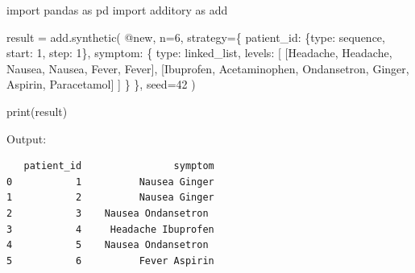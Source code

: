 \documentclass[
  letterpaper,
]{scrbook}
\newenvironment{Shaded}{\begin{snugshade}}{\end{snugshade}}
\newcommand{\BuiltInTok}[1]{\textcolor[rgb]{0.00,0.23,0.31}{#1}}
\newcommand{\DecValTok}[1]{\textcolor[rgb]{0.68,0.00,0.00}{#1}}
\newcommand{\ImportTok}[1]{\textcolor[rgb]{0.00,0.46,0.62}{#1}}
\newcommand{\NormalTok}[1]{\textcolor[rgb]{0.00,0.23,0.31}{#1}}
\newcommand{\OperatorTok}[1]{\textcolor[rgb]{0.37,0.37,0.37}{#1}}
\newcommand{\StringTok}[1]{\textcolor[rgb]{0.13,0.47,0.30}{#1}}
\begin{document}
\begin{Shaded}
\begin{Highlighting}[]
\ImportTok{import}\NormalTok{ pandas }\ImportTok{as}\NormalTok{ pd}
\ImportTok{import}\NormalTok{ additory }\ImportTok{as}\NormalTok{ add}

\NormalTok{result }\OperatorTok{=}\NormalTok{ add.synthetic(}
    \StringTok{\textquotesingle{}@new\textquotesingle{}}\NormalTok{,}
\NormalTok{    n}\OperatorTok{=}\DecValTok{6}\NormalTok{,}
\NormalTok{    strategy}\OperatorTok{=}\NormalTok{\{}
        \StringTok{\textquotesingle{}patient\_id\textquotesingle{}}\NormalTok{: \{}\StringTok{\textquotesingle{}type\textquotesingle{}}\NormalTok{: }\StringTok{\textquotesingle{}sequence\textquotesingle{}}\NormalTok{, }\StringTok{\textquotesingle{}start\textquotesingle{}}\NormalTok{: }\DecValTok{1}\NormalTok{, }\StringTok{\textquotesingle{}step\textquotesingle{}}\NormalTok{: }\DecValTok{1}\NormalTok{\},}
        \StringTok{\textquotesingle{}symptom\textquotesingle{}}\NormalTok{: \{}
            \StringTok{\textquotesingle{}type\textquotesingle{}}\NormalTok{: }\StringTok{\textquotesingle{}linked\_list\textquotesingle{}}\NormalTok{,}
            \StringTok{\textquotesingle{}levels\textquotesingle{}}\NormalTok{: [}
\NormalTok{                [}\StringTok{\textquotesingle{}Headache\textquotesingle{}}\NormalTok{, }\StringTok{\textquotesingle{}Headache\textquotesingle{}}\NormalTok{, }\StringTok{\textquotesingle{}Nausea\textquotesingle{}}\NormalTok{, }\StringTok{\textquotesingle{}Nausea\textquotesingle{}}\NormalTok{, }\StringTok{\textquotesingle{}Fever\textquotesingle{}}\NormalTok{, }\StringTok{\textquotesingle{}Fever\textquotesingle{}}\NormalTok{],}
\NormalTok{                [}\StringTok{\textquotesingle{}Ibuprofen\textquotesingle{}}\NormalTok{, }\StringTok{\textquotesingle{}Acetaminophen\textquotesingle{}}\NormalTok{, }\StringTok{\textquotesingle{}Ondansetron\textquotesingle{}}\NormalTok{, }\StringTok{\textquotesingle{}Ginger\textquotesingle{}}\NormalTok{, }\StringTok{\textquotesingle{}Aspirin\textquotesingle{}}\NormalTok{, }\StringTok{\textquotesingle{}Paracetamol\textquotesingle{}}\NormalTok{]}
\NormalTok{            ]}
\NormalTok{        \}}
\NormalTok{    \},}
\NormalTok{    seed}\OperatorTok{=}\DecValTok{42}
\NormalTok{)}

\BuiltInTok{print}\NormalTok{(result)}
\end{Highlighting}
\end{Shaded}

Output:

\begin{verbatim}
   patient_id                symptom
0           1          Nausea Ginger
1           2          Nausea Ginger
2           3    Nausea Ondansetron
3           4     Headache Ibuprofen
4           5    Nausea Ondansetron
5           6          Fever Aspirin
\end{verbatim}
\end{document}
